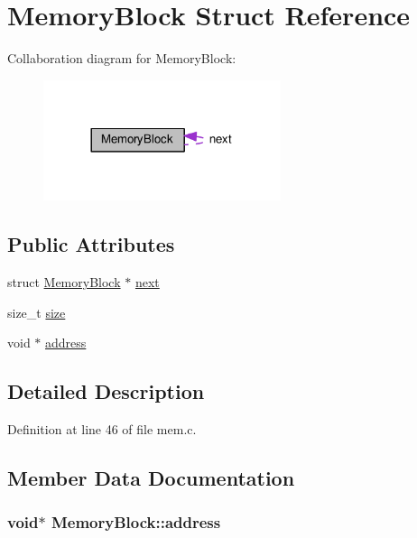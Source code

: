 \hypertarget{structMemoryBlock}{}\section{Memory\+Block Struct Reference}
\label{structMemoryBlock}


Collaboration diagram for Memory\+Block\+:
\nopagebreak
\begin{figure}[H]
\begin{center}
\leavevmode
\includegraphics[width=197pt]{d8/d47/structMemoryBlock__coll__graph}
\end{center}
\end{figure}
\subsection*{Public Attributes}
\begin{DoxyCompactItemize}
\item 
struct \hyperlink{structMemoryBlock}{Memory\+Block} $\ast$ \hyperlink{structMemoryBlock_aead31940b4b95725f6f580e2db3cfb87}{next}
\item 
size\+\_\+t \hyperlink{structMemoryBlock_a1d0be8990a795dfe51c99d3ea0ac774e}{size}
\item 
void $\ast$ \hyperlink{structMemoryBlock_a3725613ab053a5e2a814061362fe215a}{address}
\end{DoxyCompactItemize}


\subsection{Detailed Description}


Definition at line 46 of file mem.\+c.



\subsection{Member Data Documentation}
\subsubsection[{\texorpdfstring{address}{address}}]{\setlength{\rightskip}{0pt plus 5cm}void$\ast$ Memory\+Block\+::address}\hypertarget{structMemoryBlock_a3725613ab053a5e2a814061362fe215a}{}\label{structMemoryBlock_a3725613ab053a5e2a814061362fe215a}



